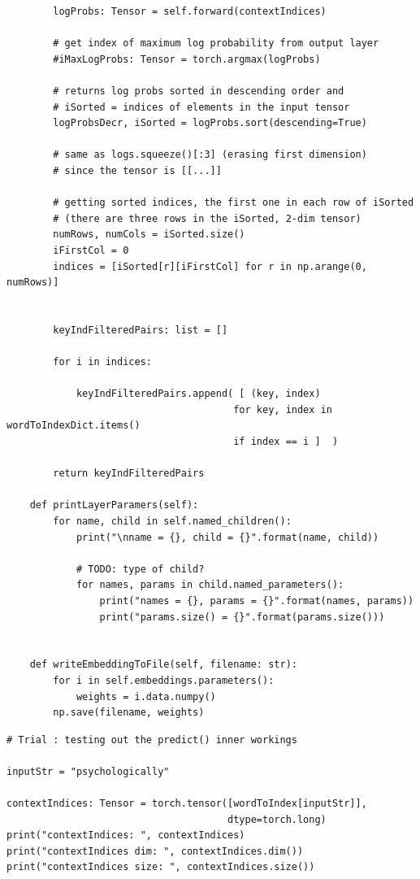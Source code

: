\documentclass[
]{article}
\begin{document}
\begin{verbatim}
        logProbs: Tensor = self.forward(contextIndices)

        # get index of maximum log probability from output layer
        #iMaxLogProbs: Tensor = torch.argmax(logProbs)

        # returns log probs sorted in descending order and
        # iSorted = indices of elements in the input tensor
        logProbsDecr, iSorted = logProbs.sort(descending=True)

        # same as logs.squeeze()[:3] (erasing first dimension)
        # since the tensor is [[...]]

        # getting sorted indices, the first one in each row of iSorted
        # (there are three rows in the iSorted, 2-dim tensor)
        numRows, numCols = iSorted.size()
        iFirstCol = 0
        indices = [iSorted[r][iFirstCol] for r in np.arange(0, numRows)]


        keyIndFilteredPairs: list = []

        for i in indices:

            keyIndFilteredPairs.append( [ (key, index)
                                       for key, index in wordToIndexDict.items()
                                       if index == i ]  )

        return keyIndFilteredPairs

    def printLayerParamers(self):
        for name, child in self.named_children():
            print("\nname = {}, child = {}".format(name, child))

            # TODO: type of child?
            for names, params in child.named_parameters():
                print("names = {}, params = {}".format(names, params))
                print("params.size() = {}".format(params.size()))


    def writeEmbeddingToFile(self, filename: str):
        for i in self.embeddings.parameters():
            weights = i.data.numpy()
        np.save(filename, weights)
\end{verbatim}

\begin{verbatim}
# Trial : testing out the predict() inner workings

inputStr = "psychologically"

contextIndices: Tensor = torch.tensor([wordToIndex[inputStr]],
                                      dtype=torch.long)
print("contextIndices: ", contextIndices)
print("contextIndices dim: ", contextIndices.dim())
print("contextIndices size: ", contextIndices.size())

\end{verbatim}
\end{document}
